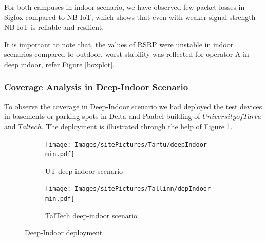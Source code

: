 \documentclass[12pt]{article}
\begin{document}
For both campuses in indoor scenario, we have observed few packet losses in Sigfox compared to NB-IoT, which shows that even with weaker signal strength NB-IoT is reliable and resilient.\par

It is important to note that, the values of RSRP were unstable in indoor scenarios compared to outdoor, worst stability was reflected for operator A in deep indoor, refer Figure \ref{boxplot}.

\subsubsection{Coverage Analysis in Deep-Indoor Scenario} \label{deep-indoor analysis}
To observe the coverage in Deep-Indoor scenario we had deployed the test devices in basements or parking spots in Delta and Paabel building of $University of Tartu$ and $Taltech$. The deployment is illustrated through the help of Figure \ref{fig:Deep-Indoor deployment}.

\begin{figure}[H]
\centering
\begin{subfigure}{0.49 \linewidth}
  \centering
  \texttt{[image: Images/sitePictures/Tartu/deepIndoor-min.pdf]}
  \caption{UT deep-indoor scenario}
  \end{subfigure}%
  \begin{subfigure}{0.49 \linewidth}
    \centering
    \texttt{[image: Images/sitePictures/Tallinn/depIndoor-min.pdf]}
    \caption{TalTech deep-indoor scenario}
  \end{subfigure}
   
    \caption{Deep-Indoor deployment}
    \label{fig:Deep-Indoor deployment}
\end{figure}
\end{document}
